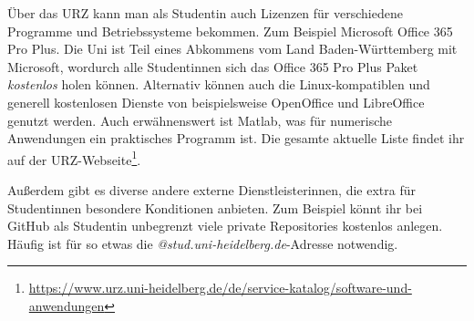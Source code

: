 Über das URZ kann man als Studentin auch Lizenzen für verschiedene Programme und Betriebssysteme bekommen. Zum Beispiel Microsoft Office 365 Pro Plus. Die Uni ist Teil eines Abkommens vom Land Baden-Württemberg mit Microsoft, wordurch alle Studentinnen sich das Office 365 Pro Plus Paket \emph{kostenlos} holen können. Alternativ können auch die Linux-kompatiblen und generell kostenlosen Dienste von beispielsweise OpenOffice und LibreOffice genutzt werden. Auch erwähnenswert ist Matlab, was für numerische Anwendungen ein praktisches Programm ist. Die gesamte aktuelle Liste findet ihr auf der URZ-Webseite\footnote{\url{https://www.urz.uni-heidelberg.de/de/service-katalog/software-und-anwendungen}}.

Außerdem gibt es diverse andere externe Dienstleisterinnen, die extra für Studentinnen besondere Konditionen anbieten. Zum Beispiel könnt ihr bei GitHub als Studentin unbegrenzt viele private Repositories kostenlos anlegen. Häufig ist für so etwas die \emph{@stud.uni-heidelberg.de}-Adresse notwendig.
